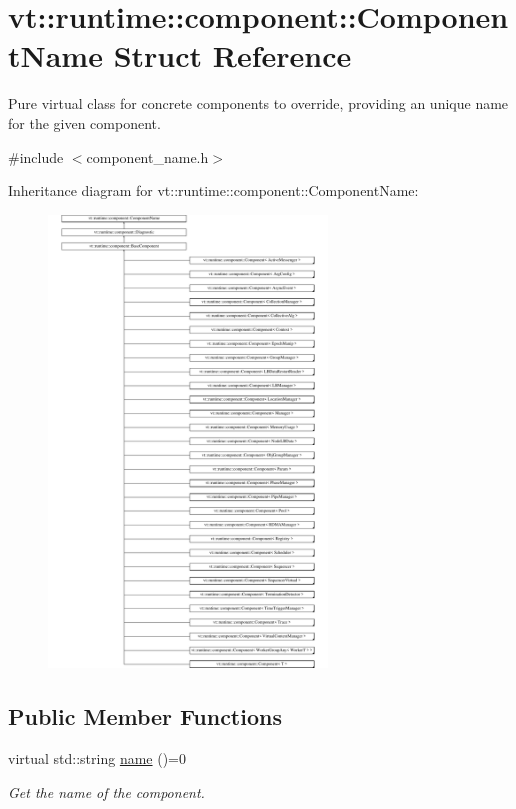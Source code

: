 \hypertarget{structvt_1_1runtime_1_1component_1_1_component_name}{}\section{vt\+:\+:runtime\+:\+:component\+:\+:Component\+Name Struct Reference}
\label{structvt_1_1runtime_1_1component_1_1_component_name}


Pure virtual class for concrete components to override, providing an unique name for the given component.  




{\ttfamily \#include $<$component\+\_\+name.\+h$>$}

Inheritance diagram for vt\+:\+:runtime\+:\+:component\+:\+:Component\+Name\+:\begin{figure}[H]
\begin{center}
\leavevmode
\includegraphics[height=12.000000cm]{structvt_1_1runtime_1_1component_1_1_component_name}
\end{center}
\end{figure}
\subsection*{Public Member Functions}
\begin{DoxyCompactItemize}
\item 
virtual std\+::string \hyperlink{structvt_1_1runtime_1_1component_1_1_component_name_a33c06229bb605a2b2ceff68830d6d773}{name} ()=0
\begin{DoxyCompactList}\small\item\em Get the name of the component. \end{DoxyCompactList}\end{DoxyCompactItemize}


